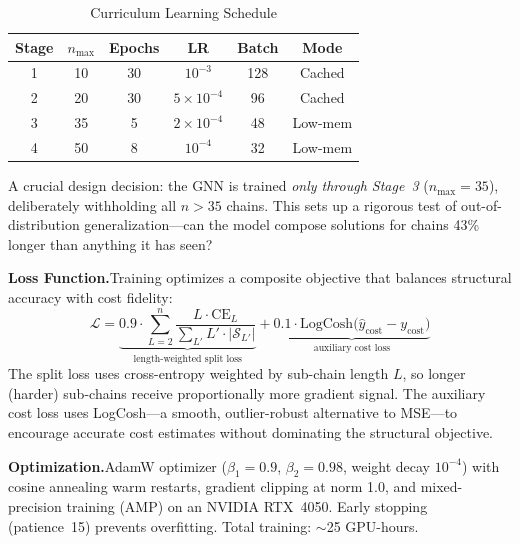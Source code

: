 \documentclass[conference]{IEEEtran}
\begin{document}
\begin{table}[htbp]
\caption{Curriculum Learning Schedule}
\label{tab:curriculum}
\begin{center}
\renewcommand{\arraystretch}{1.2}
\setlength{\tabcolsep}{6pt}
\begin{tabular}{|c|c|c|c|c|c|}
\hline
\textbf{Stage} & \textbf{$n_{\max}$} & \textbf{Epochs} & \textbf{LR} & \textbf{Batch} & \textbf{Mode} \\
\hline
1 & 10  & 30 & $10^{-3}$   & 128 & Cached \\
2 & 20  & 30 & $5{\times}10^{-4}$ & 96  & Cached \\
3 & 35  & 5  & $2{\times}10^{-4}$ & 48  & Low-mem \\
4 & 50  & 8  & $10^{-4}$   & 32  & Low-mem \\
\hline
\end{tabular}
\end{center}
\end{table}

A crucial design decision: the GNN is trained \emph{only through Stage~3} ($n_{\max}{=}35$), deliberately withholding all $n{>}35$ chains. This sets up a rigorous test of out-of-distribution generalization---can the model compose solutions for chains 43\% longer than anything it has seen?

\medskip
\noindent\textbf{Loss Function.}\quad Training optimizes a composite objective that balances structural accuracy with cost fidelity:
\begin{equation}
\mathcal{L} = \underbrace{0.9 \cdot \sum_{L=2}^{n} \frac{L \cdot \text{CE}_L}{\sum_{L'} L' \cdot |\mathcal{S}_{L'}|}}_{\text{length-weighted split loss}} + \underbrace{0.1 \cdot \text{LogCosh}\bigl(\hat{y}_{\text{cost}} - y_{\text{cost}}\bigr)}_{\text{auxiliary cost loss}}
\label{eq:loss}
\end{equation}
The split loss uses cross-entropy weighted by sub-chain length $L$, so longer (harder) sub-chains receive proportionally more gradient signal. The auxiliary cost loss uses LogCosh---a smooth, outlier-robust alternative to MSE---to encourage accurate cost estimates without dominating the structural objective.

\medskip
\noindent\textbf{Optimization.}\quad AdamW optimizer ($\beta_1{=}0.9$, $\beta_2{=}0.98$, weight decay $10^{-4}$) with cosine annealing warm restarts, gradient clipping at norm 1.0, and mixed-precision training (AMP) on an NVIDIA RTX~4050. Early stopping (patience~15) prevents overfitting. Total training: ${\sim}$25 GPU-hours.
\end{document}
